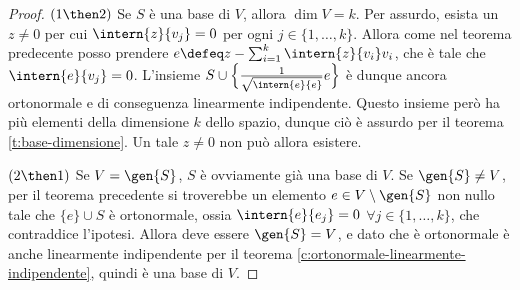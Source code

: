 \begin{proof}
	$(1\then 2)$ Se $S$ è una base di $V$, allora $\dim V=k$.
	Per assurdo, esista un $z\ne 0$ per cui $\intern{z}{v_j}=0$ per ogni $j\in\{1,\dots,k\}$.
	Allora come nel teorema predecente posso prendere $e\defeq z-\sum_{i=1}^k\intern{z}{v_i}v_i$, che è tale che $\intern{e}{v_j}=0$.
	L'insieme $S\cup\Big\{\frac1{\sqrt{\intern{e}{e}}}e\Big\}$ è dunque ancora ortonormale e di conseguenza linearmente indipendente.
	Questo insieme però ha più elementi della dimensione $k$ dello spazio, dunque ciò è assurdo per il teorema \ref{t:base-dimensione}.
	Un tale $z\ne 0$ non può allora esistere.
	
	$(2\then 1)$ Se $V=\gen{S}$, $S$ è ovviamente già una base di $V$.
	Se $\gen{S}\ne V$, per il teorema precedente si troverebbe un elemento $e\in V\setminus\gen{S}$ non nullo tale che $\{e\}\cup S$ è ortonormale, ossia $\intern{e}{e_j}=0$ $\forall j\in\{1,\dots,k\}$, che contraddice l'ipotesi.
	Allora deve essere $\gen{S}=V$, e dato che è ortonormale è anche linearmente indipendente per il teorema \ref{c:ortonormale-linearmente-indipendente}, quindi è una base di $V$.
\end{proof}

